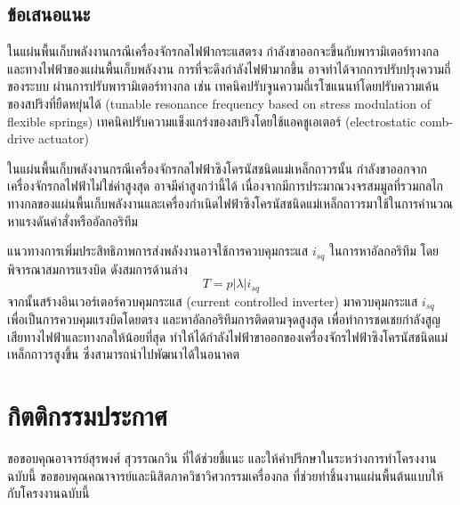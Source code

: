 \documentclass[11pt,a4paper]{article}
\begin{document}
\subsection{ข้อเสนอแนะ}
ในแผ่นพื้นเก็บพลังงานกรณีเครื่องจักรกลไฟฟ้ากระแสตรง กำลังขาออกจะขึ้นกับพารามิเตอร์ทางกลและทางไฟฟ้าของแผ่นพื้นเก็บพลังงาน การที่จะดึงกำลังไฟฟ้ามากขึ้น อาจทำได้จากการปรับปรุงความถี่ของระบบ ผ่านการปรับพารามิเตอร์ทางกล เช่น เทคนิคปรับจูนความถี่เรโซแนนท์โดยปรับความเค้นของสปริงที่ยืดหยุ่นได้ (tunable resonance frequency based on stress modulation of flexible springs) เทคนิคปรับความแข็งแกร่งของสปริงโดยใช้แอคชูเอเตอร์ (electrostatic comb-drive actuator)

ในแผ่นพื้นเก็บพลังงานกรณีเครื่องจักรกลไฟฟ้าซิงโครนัสชนิดแม่เหล็กถาวรนั้น กำลังขาออกจากเครื่องจักรกลไฟฟ้าไม่ใช่ค่าสูงสุด อาจมีค่าสูงกว่านี้ได้ เนื่องจากมีการประมาณวงจรสมมูลที่รวมกลไกทางกลของแผ่นพื้นเก็บพลังงานและเครื่องกำเนิดไฟฟ้าซิงโครนัสชนิดแม่เหล็กถาวรมาใช้ในการคำนวณหาแรงดันคำสั่งหรืออัลกอริทึม

แนวทางการเพิ่มประสิทธิภาพการส่งพลังงานอาจใช้การควบคุมกระแส $i_{sq}$ ในการหาอัลกอริทึม โดยพิจารณาสมการแรงบิด ดังสมการด้านล่าง
\begin{equation}
    T = p|\lambda|i_{sq}
\end{equation}
จากนั้นสร้างอินเวอร์เตอร์ควบคุมกระแส (current controlled inverter) มาควบคุมกระแส $i_{sq}$ เพื่อเป็นการควบคุมแรงบิดโดยตรง และหาอัลกอริทึมการติดตามจุดสูงสุด เพื่อทำการชดเชยกำลังสูญเสียทางไฟฟ้าและทางกลให้น้อยที่สุด ทำให้ได้กำลังไฟฟ้าขาออกของเครื่องจักรไฟฟ้าซิงโครนัสชนิดแม่เหล็กถาวรสูงขึ้น ซึ่งสามารถนำไปพัฒนาได้ในอนาคต





\section{กิตติกรรมประกาศ}
ขอขอบคุณอาจารย์สุรพงศ์ สุวรรณกวิน ที่ได้ช่วยชี้แนะ และให้คำปรึกษาในระหว่างการทำโครงงานฉบับนี้ ขอขอบคุณคณาจารย์และนิสิตภาควิชาวิศวกรรมเครื่องกล ที่ช่วยทำชิ้นงานแผ่นพื้นต้นแบบให้กับโครงงานฉบับนี้
\end{document}

